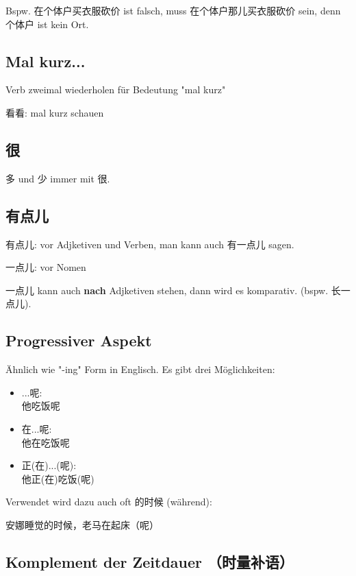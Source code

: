 \documentclass[UTF8]{ctexart}
\begin{document}
Bspw. 在个体户买衣服砍价 ist falsch, muss 在个体户那儿买衣服砍价 sein, denn 个体户 ist kein Ort.\\

\subsection{Mal kurz...}

Verb zweimal wiederholen für Bedeutung "mal kurz"

看看: mal kurz schauen

\subsection{很}

多 und 少 immer mit 很.

\subsection{有点儿}

有点儿: vor Adjketiven und Verben, man kann auch 有一点儿 sagen.

一点儿: vor Nomen

一点儿 kann auch \textbf{nach} Adjketiven stehen, dann wird es komparativ. (bspw. 长一点儿). 

\subsection{Progressiver Aspekt}

Ähnlich wie "-ing" Form in Englisch. Es gibt drei Möglichkeiten:

\begin{itemize}
    \item ...呢:\\他吃饭呢
    \item 在...呢:\\他在吃饭呢
    \item 正(在)...(呢):\\他正(在)吃饭(呢)
\end{itemize}

Verwendet wird dazu auch oft 的时候 (während):

安娜睡觉的时候，老马在起床（呢）

\subsection{Komplement der Zeitdauer （时量补语）}
\end{document}
